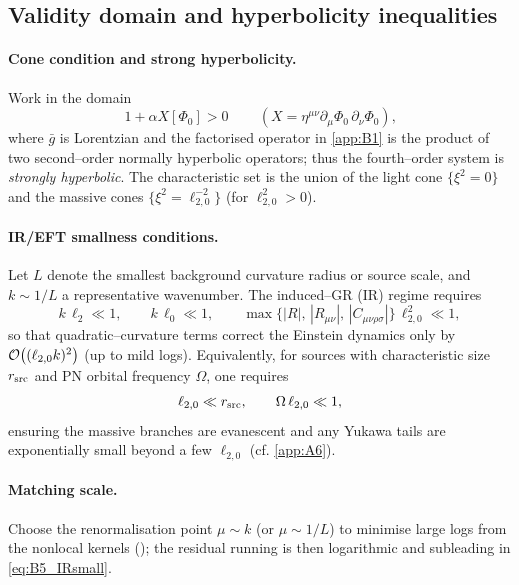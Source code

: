 \documentclass{iopjournal}
\begin{document}
\subsection{Validity domain and hyperbolicity inequalities}\label{app:B5}
\paragraph{Cone condition and strong hyperbolicity.}
Work in the domain
\begin{equation}
\boxed{\,1+\alpha X[\Phi_0]>0\,}
\qquad (X=\eta^{\mu\nu}\partial_\mu\Phi_0\,\partial_\nu\Phi_0),
\label{eq:B5_cone}
\end{equation}
where $\bar g$ is Lorentzian and the factorised operator in \cref{app:B1} is the product of two second–order normally hyperbolic operators; thus the fourth–order system is \emph{strongly hyperbolic}. The characteristic set is the union of the light cone $\{\xi^2=0\}$ and the massive cones $\{\xi^2=\ell_{2,0}^{-2}\}$ (for $\ell_{2,0}^2>0$).

\paragraph{IR/EFT smallness conditions.}
Let $L$ denote the smallest background curvature radius or source scale, and $k\sim 1/L$ a representative wavenumber. The induced–GR (IR) regime requires
\begin{equation}
k\,\ell_{2}\ll1,\qquad k\,\ell_{0}\ll1,
\qquad
\max\{|R|,\,|R_{\mu\nu}|,\,|C_{\mu\nu\rho\sigma}|\}\,\ell_{2,0}^2\ll1,
\label{eq:B5_IRsmall}
\end{equation}
so that quadratic–curvature terms correct the Einstein dynamics only by $\order{(\ell_{2,0}k)^2}$ (up to mild logs). Equivalently, for sources with characteristic size $r_{\rm src}$ and PN orbital frequency $\Omega$, one requires
\[
\ell_{2,0}\ll r_{\rm src},\qquad \Omega\,\ell_{2,0}\ll1,
\]
ensuring the massive branches are evanescent and any Yukawa tails are exponentially small beyond a few $\ell_{2,0}$ (cf. \cref{app:A6}).

\paragraph{Matching scale.}
Choose the renormalisation point $\mu\sim k$ (or $\mu\sim 1/L$) to minimise large logs from the nonlocal kernels (); the residual running is then logarithmic and subleading in \eqref{eq:B5_IRsmall}.
\end{document}
